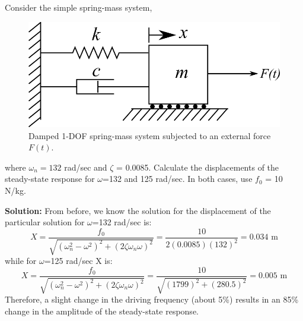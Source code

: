 \documentclass[12pt,letter]{article}
\begin{document}
	
	
\begin{example}

	Consider the simple spring-mass system, 
	\begin{figure}[H]
		\centering
		\includegraphics[]{../figures/1-DOF-spring_dashpot_mass_horizontal_forced.png}
		\caption{Damped 1-DOF spring-mass system subjected to an external force $F(t)$.}
	\end{figure}				
	\noindent where $\omega_n = 132$ rad/sec and $\zeta$ = 0.0085. Calculate the displacements of the steady-state response for $\omega$=132 and 125 rad/sec. In both cases, use $f_0$ = 10 N/kg. 

	\noindent\textbf{Solution:}	From before, we know the solution for the displacement of the particular solution for $\omega$=132 rad/sec is:
	\begin{equation}
		X = \frac{f_0}{\sqrt{(\omega_n^2 - \omega^2)^2 +  (2\zeta \omega_n \omega)^2}} = \frac{10}{2(0.0085)(132)^2} = 0.034 \text{ m}
	\end{equation}							
	while for $\omega$=125 rad/sec X is:
	\begin{equation}
		X = \frac{f_0}{\sqrt{(\omega_n^2 - \omega^2)^2 +  (2\zeta \omega_n \omega)^2}} = \frac{10}{\sqrt{(1799)^2 +  (280.5)^2}}  = 0.005 \text{ m}
	\end{equation}				
	Therefore, a slight change in the driving frequency (about 5\%) results in an 85\% change in the amplitude of the steady-state response. 
\end{example}
\end{document}
